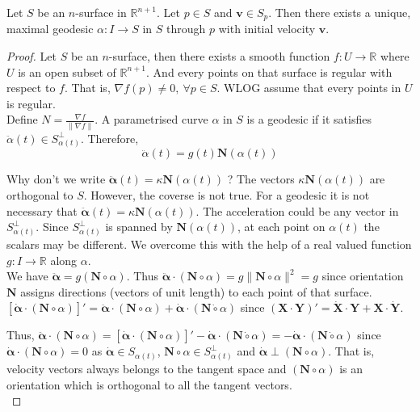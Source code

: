 \begin{theorem}
	Let $S$ be an $n$-surface in $\mathbb{R}^{n+1}$. Let $p \in S$ and $\mathbf{v} \in S_p$. Then there exists a unique, maximal geodesic $\alpha : I \to S$ in $S$ through $p$ with initial velocity $\mathbf{v}$.
\end{theorem}
\begin{proof}
	Let $S$ be an $n$-surface, then there exists a smooth function $f : U \to \mathbb{R}$ where $U$ is an open subset of $\mathbb{R}^{n+1}$. And every points on that surface is regular with respect to $f$. That is, $\nabla f(p) \ne 0,\ \forall p \in S$. WLOG assume that every points in $U$ is regular.\\
	
	Define $N = \frac{\nabla f}{\|\nabla f\|}$. A parametrised curve $\alpha$ in $S$ is a geodesic if it satisfies $\ddot{\alpha}(t) \in S_{\alpha(t)}^\perp$. Therefore,
	\begin{equation}
		\ddot{\alpha}(t) = g(t)\mathbf{N}(\alpha(t))
		\label{eq:acceleration}
	\end{equation}

	Why don't we write $\ddot{\boldsymbol{\alpha}}(t) = \kappa \mathbf{N}(\alpha(t))$ ? The vectors $\kappa \mathbf{N}(\alpha(t))$ are orthogonal to $S$. However, the coverse is not true. For a geodesic it is not necessary that $\ddot{\boldsymbol{\alpha}}(t) =  \kappa \mathbf{N}(\alpha(t))$. The acceleration could be any vector in $S_{\alpha(t)}^\perp$. Since $S_{\alpha(t)}^\perp$ is spanned by $\mathbf{N}(\alpha(t))$, at each point on $\alpha(t)$ the scalars may be different. We overcome this with the help of a real valued function $g : I \to \mathbb{R}$ along $\alpha$.\\

	We have $\ddot{\boldsymbol{\alpha}} = g(\mathbf{N}\circ \alpha)$. Thus $\ddot{\boldsymbol{\alpha}} \cdot (\mathbf{N}\circ\alpha) = g \| \mathbf{N}\circ \alpha \|^2 = g$ since orientation $\mathbf{N}$ assigns directions (vectors of unit length) to each point of that surface.\\

	$\left[\dot{\boldsymbol{\alpha}} \cdot (\mathbf{N} \circ \alpha)\right]' = \ddot{\boldsymbol{\alpha}} \cdot (\mathbf{N} \circ \alpha) + \dot{\boldsymbol{\alpha}} \cdot (\mathbf{N} \dot{\circ} \alpha)$	since $(\mathbf{X} \cdot \mathbf{Y})' = \dot{\mathbf{X}} \cdot \mathbf{Y} + \mathbf{X} \cdot \dot{\mathbf{Y}}$.

	Thus, $\ddot{\boldsymbol{\alpha}} \cdot (\mathbf{N} \circ \alpha) = \left[ \dot{\boldsymbol{\alpha}} \cdot (\mathbf{N} \circ \alpha) \right]' - \dot{\boldsymbol{\alpha}} \cdot (\mathbf{N} \dot{\circ} \alpha) = -\dot{\boldsymbol{\alpha}} \cdot (\mathbf{N} \dot{\circ} \alpha)$ since $\dot{\boldsymbol{\alpha}} \cdot (\mathbf{N} \circ \alpha) = 0$ as $\dot{\boldsymbol{\alpha}} \in S_{\alpha(t)}$, $\mathbf{N} \circ \alpha \in S_{\alpha(t)}^\perp$ and $\dot{\boldsymbol{\alpha}} \perp (\mathbf{N} \circ \alpha)$. That is, velocity vectors always belongs to the tangent space and $(\mathbf{N} \circ \alpha)$ is an orientation which is orthogonal to all the tangent vectors.\\


\end{proof}
